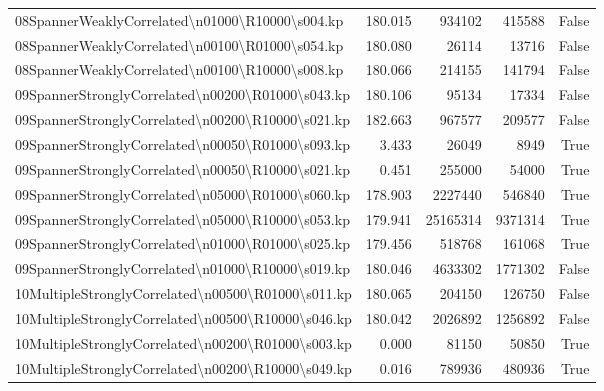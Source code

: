 \documentclass[english, a4paper,12pt]{article}
\begin{document}
\begin{tabularx}{0.95\textwidth}{|>{\raggedright\arraybackslash}Xrrrr|}
08SpannerWeaklyCorrelated\textbackslash n01000\textbackslash R10000\textbackslash s004.kp & 180.015 & 934102 & 415588 & False \\
08SpannerWeaklyCorrelated\textbackslash n00100\textbackslash R01000\textbackslash s054.kp & 180.080 & 26114 & 13716 & False \\
08SpannerWeaklyCorrelated\textbackslash n00100\textbackslash R10000\textbackslash s008.kp & 180.066 & 214155 & 141794 & False \\
\hline
\addlinespace
\hline
09SpannerStronglyCorrelated\textbackslash n00200\textbackslash R01000\textbackslash s043.kp & 180.106 & 95134 & 17334 & False \\
09SpannerStronglyCorrelated\textbackslash n00200\textbackslash R10000\textbackslash s021.kp & 182.663 & 967577 & 209577 & False \\
09SpannerStronglyCorrelated\textbackslash n00050\textbackslash R01000\textbackslash s093.kp & 3.433 & 26049 & 8949 & True \\
09SpannerStronglyCorrelated\textbackslash n00050\textbackslash R10000\textbackslash s021.kp & 0.451 & 255000 & 54000 & True \\
09SpannerStronglyCorrelated\textbackslash n05000\textbackslash R01000\textbackslash s060.kp & 178.903 & 2227440 & 546840 & True \\
09SpannerStronglyCorrelated\textbackslash n05000\textbackslash R10000\textbackslash s053.kp & 179.941 & 25165314 & 9371314 & True \\
09SpannerStronglyCorrelated\textbackslash n01000\textbackslash R01000\textbackslash s025.kp & 179.456 & 518768 & 161068 & True \\
09SpannerStronglyCorrelated\textbackslash n01000\textbackslash R10000\textbackslash s019.kp & 180.046 & 4633302 & 1771302 & False \\
\hline
\addlinespace
\hline
10MultipleStronglyCorrelated\textbackslash n00500\textbackslash R01000\textbackslash s011.kp & 180.065 & 204150 & 126750 & False \\
10MultipleStronglyCorrelated\textbackslash n00500\textbackslash R10000\textbackslash s046.kp & 180.042 & 2026892 & 1256892 & False \\
10MultipleStronglyCorrelated\textbackslash n00200\textbackslash R01000\textbackslash s003.kp & 0.000 & 81150 & 50850 & True \\
10MultipleStronglyCorrelated\textbackslash n00200\textbackslash R10000\textbackslash s049.kp & 0.016 & 789936 & 480936 & True \\

\end{tabularx}
\end{document}
